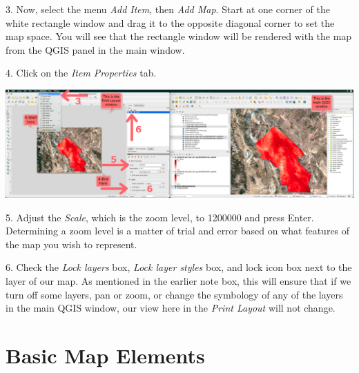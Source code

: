 \documentclass[oneside,a4paper,11pt,explicit]{book}
\begin{document}
3. Now, select the menu \textit{Add Item}, then \textit{Add Map}. Start at one corner of the white rectangle window and drag it to the opposite diagonal corner to set the map space. You will see that the rectangle window will be rendered with the map from the QGIS panel in the main window.


4. Click on the \textit{Item Properties} tab.

\vspace{.5em}

\centerline{\includegraphics[width=\textwidth]{AddMapToPrintLayout.png}}


5. Adjust the \textit{Scale}, which is the zoom level, to 1200000 and press Enter. Determining a zoom level is a matter of trial and error based on what features of the map you wish to represent. 

6. Check the \textit{Lock layers} box, \textit{Lock layer styles} box, and lock icon box next to the layer of our map. As mentioned in the earlier note box, this will ensure that if we turn off some layers, pan or zoom, or change the symbology of any of the layers in the main QGIS window, our view here in the \textit{Print Layout} will not change.

\section{Basic Map Elements}
\end{document}
